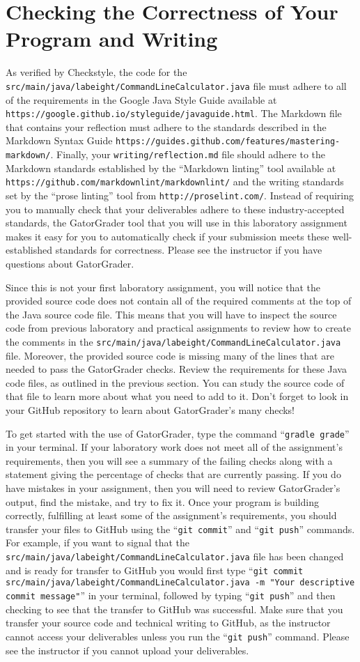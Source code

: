 \documentclass[11pt]{article}
\newcommand{\mainprogramsource}{\lstinline{src/main/java/labeight/CommandLineCalculator.java}}
\newcommand{\reflection}{\lstinline{writing/reflection.md}}
\newcommand{\gatorgraderstart}{\command{gradle grade}}
\newcommand{\gitcommit}{\command{git commit}}
\newcommand{\gitpush}{\command{git push}}
\newcommand{\gitcommitmainprogram}{\command{git commit src/main/java/labeight/CommandLineCalculator.java -m "Your
descriptive commit message"}}
\newcommand{\command}[1]{``\lstinline{#1}''}
\newcommand{\url}[1]{\lstinline{#1}}
\newcommand{\step}[1]{``{#1}''}
\begin{document}
\section*{Checking the Correctness of Your Program and Writing}

As verified by Checkstyle, the code for the \mainprogramsource{} file must
adhere to all of the requirements in the Google Java Style Guide available at
\url{https://google.github.io/styleguide/javaguide.html}. The Markdown file that
contains your reflection must adhere to the standards described in the Markdown
Syntax Guide \url{https://guides.github.com/features/mastering-markdown/}.
Finally, your \reflection{} file should adhere to the Markdown standards
established by the \step{Markdown linting} tool available at
\url{https://github.com/markdownlint/markdownlint/} and the writing standards
set by the \step{prose linting} tool from \url{http://proselint.com/}. Instead
of requiring you to manually check that your deliverables adhere to these
industry-accepted standards, the GatorGrader tool that you will use in this
laboratory assignment makes it easy for you to automatically check if your
submission meets these well-established standards for correctness. Please see
the instructor if you have questions about GatorGrader.

Since this is not your first laboratory assignment, you will notice that the
provided source code does not contain all of the required comments at the top of
the Java source code file. This means that you will have to inspect the source
code from previous laboratory and practical assignments to review how to create
the comments in the \mainprogramsource{} file. Moreover, the provided source
code is missing many of the lines that are needed to pass the GatorGrader
checks. Review the requirements for these Java code files, as outlined in the
previous section. You can study the source code of that file to learn more about
what you need to add to it. Don't forget to look in your GitHub repository to
learn about GatorGrader's many checks!

To get started with the use of GatorGrader, type the command \gatorgraderstart{}
in your terminal. If your laboratory work does not meet all of the assignment's
requirements, then you will see a summary of the failing checks along with a
statement giving the percentage of checks that are currently passing. If you do
have mistakes in your assignment, then you will need to review GatorGrader's
output, find the mistake, and try to fix it. Once your program is building
correctly, fulfilling at least some of the assignment's requirements, you should
transfer your files to GitHub using the \gitcommit{} and \gitpush{} commands.
For example, if you want to signal that the \mainprogramsource{} file has been
changed and is ready for transfer to GitHub you would first type
\gitcommitmainprogram{} in your terminal, followed by typing \gitpush{} and then
checking to see that the transfer to GitHub was successful. Make sure that you
transfer your source code and technical writing to GitHub, as the instructor
cannot access your deliverables unless you run the \gitpush{} command. Please
see the instructor if you cannot upload your deliverables.
\end{document}
